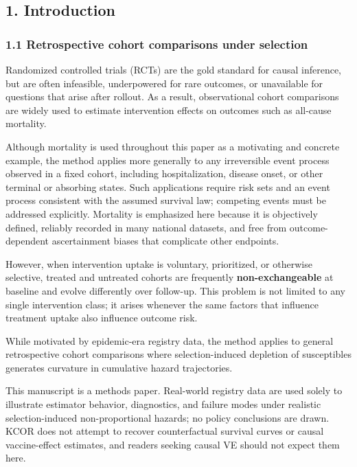 \documentclass[
]{article}
\begin{document}
\subsection{1. Introduction}\label{introduction}

\subsubsection{1.1 Retrospective cohort comparisons under selection}\label{retrospective-cohort-comparisons-under-selection}

Randomized controlled trials (RCTs) are the gold standard for causal inference, but are often infeasible, underpowered for rare outcomes, or unavailable for questions that arise after rollout. As a result, observational cohort comparisons are widely used to estimate intervention effects on outcomes such as all-cause mortality.

Although mortality is used throughout this paper as a motivating and concrete example, the method applies more generally to any irreversible event process observed in a fixed cohort, including hospitalization, disease onset, or other terminal or absorbing states. Such applications require risk sets and an event process consistent with the assumed survival law; competing events must be addressed explicitly. Mortality is emphasized here because it is objectively defined, reliably recorded in many national datasets, and free from outcome-dependent ascertainment biases that complicate other endpoints.

However, when intervention uptake is voluntary, prioritized, or otherwise selective, treated and untreated cohorts are frequently \textbf{non-exchangeable} at baseline and evolve differently over follow-up. This problem is not limited to any single intervention class; it arises whenever the same factors that influence treatment uptake also influence outcome risk.

While motivated by epidemic-era registry data, the method applies to general retrospective cohort comparisons where selection-induced depletion of susceptibles generates curvature in cumulative hazard trajectories.

This manuscript is a methods paper. Real-world registry data are used solely to illustrate estimator behavior, diagnostics, and failure modes under realistic selection-induced non-proportional hazards; no policy conclusions are drawn. KCOR does not attempt to recover counterfactual survival curves or causal vaccine-effect estimates, and readers seeking causal VE should not expect them here.
\end{document}
